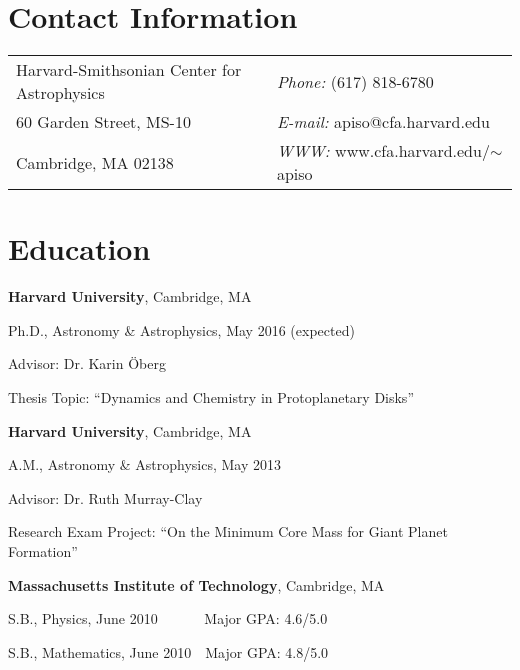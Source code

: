 \documentclass[margin,line]{res}
\newenvironment{list1}{
  \begin{list}{\ding{113}}{%
      \setlength{\itemsep}{0in}
      \setlength{\parsep}{0in} \setlength{\parskip}{0in}
      \setlength{\topsep}{0in} \setlength{\partopsep}{0in} 
      \setlength{\leftmargin}{0.17in}}}{\end{list}}
\begin{document}

\begin{resume}
\section{\sc Contact Information}
\vspace{.05in}
\begin{tabular}{@{}p{3.5in}p{4in}}
           
Harvard-Smithsonian Center for Astrophysics & {\it Phone:}    (617) 818-6780 \\         
60 Garden Street, MS-10 & {\it E-mail:}  apiso@cfa.harvard.edu\\       
Cambridge, MA  02138  & {\it WWW:} www.cfa.harvard.edu/$\sim$apiso \\     
\end{tabular}



\section{\sc Education}
{\bf Harvard University}, Cambridge, MA \\
\begin{list1}
\vspace{-0.1in}
\item[] Ph.D., Astronomy \& Astrophysics, May 2016 (expected)
\item[] Advisor: Dr. Karin \"Oberg 
\item[] Thesis Topic: ``Dynamics and Chemistry in Protoplanetary Disks''   
\end{list1}
{\bf Harvard University}, Cambridge, MA \\
\begin{list1}
\vspace{-0.1in}
\item[] A.M., Astronomy \& Astrophysics, May 2013
\item[] Advisor: Dr. Ruth Murray-Clay
\item[] Research Exam Project: ``On the Minimum Core Mass for Giant Planet Formation''
\end{list1}
{\bf Massachusetts Institute of Technology}, Cambridge, MA\\
\vspace*{-.1in}
\begin{list1}
\item[] S.B., Physics,  June 2010 \,\,\,\,\,\,\,\,\,\,\,\,\,\,\,\, Major GPA: 4.6/5.0
\item[] S.B., Mathematics, June 2010\,\,\,\, Major GPA: 4.8/5.0
\end{list1}


\end{resume}
\end{document}
